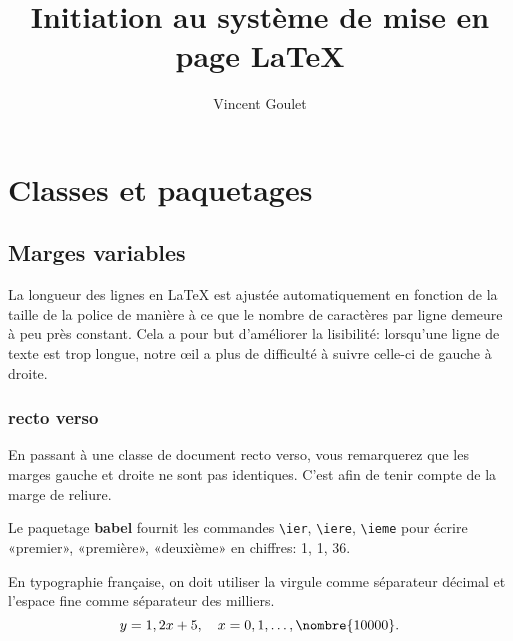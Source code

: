 \documentclass[11pt,french]{memoir}
\title{Initiation au système de mise en page \LaTeX}
\author{Vincent Goulet}
\begin{document}
\maketitle

\chapter{Classes et paquetages}

\section{Marges variables}

La longueur des lignes en {\LaTeX} est ajustée automatiquement en
fonction de la taille de la police de manière à ce que le nombre de
caractères par ligne demeure à peu près constant. Cela a pour but
d'améliorer la lisibilité: lorsqu'une ligne de texte est trop longue,
notre œil a plus de difficulté à suivre celle-ci de gauche à droite.

\subsection{recto verso}

En passant à une classe de document recto verso, vous remarquerez que
les marges gauche et droite ne sont pas identiques. C'est afin de
tenir compte de la marge de reliure.

Le paquetage \textbf{babel} fournit les commandes \verb=\ier=,
\verb=\iere=, \verb=\ieme= pour écrire «premier», «première»,
«deuxième» en chiffres: 1{\ier}, 1{\iere}, 36{\ieme}.

En typographie française, on doit utiliser la virgule comme séparateur
décimal et l'espace fine comme séparateur des milliers.
\begin{displaymath}
  y = 1,2x + 5, \quad x = 0, 1, \dots, \nombre{10 000}.
\end{displaymath}
\end{document}
